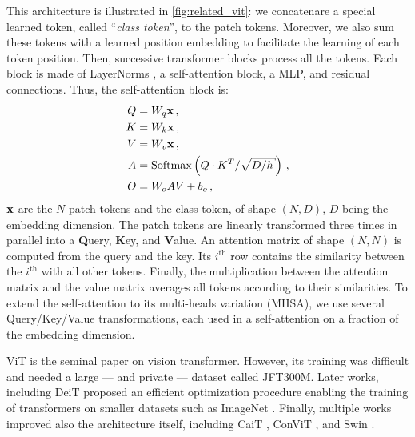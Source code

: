 This architecture is illustrated in \autoref{fig:related_vit}: we concatenare a special learned
token, called ``\textit{class token}'', to the patch tokens. Moreover, we also sum these tokens with
a learned position embedding to facilitate the learning of each token position. Then, successive
transformer blocks process all the tokens. Each block is made of LayerNorms \citep{ba2016layernorm},
a self-attention block, a \ac{MLP}, and residual connections. Thus, the self-attention block is:
%
\begin{equation}
      \begin{aligned}
            Q & =W_{q} \vx\,,                                                       \\
            K & =W_{k} \vx\,,                                                       \\
            V & =W_{v} \vx\,,                                                       \\
            A & =\operatorname{Softmax}\left(Q \cdot K^{T} / \sqrt{D / h}\right)\,, \\
            O & = W_{o} A V+b_{o}\,,
      \end{aligned}
      \label{sec:related_sa}
\end{equation}
%
\noindent $\mathbf{x}$ are the $N$ patch tokens and the class token, of shape $(N, D)$, $D$ being the
embedding dimension. The patch tokens are linearly transformed three times in parallel into a
\textbf{Q}uery, \textbf{K}ey, and \textbf{V}alue. An attention matrix of shape $(N, N)$ is computed
from the query and the key. Its $i^{\text{th}}$ row contains the similarity between the
$i^{\text{th}}$ with all other tokens. Finally, the multiplication between the attention matrix and
the value matrix averages all tokens according to their similarities. To extend the self-attention
to its multi-heads variation (\ac{MHSA}), we use several Query/Key/Value transformations, each
used in a self-attention on a fraction of the embedding dimension.

ViT \citep{dosovitskiy2020vit} is the seminal paper on vision transformer. However, its training was
difficult and needed a large --- and private --- dataset called JFT300M. Later works, including DeiT
\citep{touvron2021deit} proposed an efficient optimization procedure enabling the training of
transformers on smaller datasets such as ImageNet \citep{russakovsky2015imagenet_ilsvrc}. Finally,
multiple works improved also the architecture itself, including CaiT \citep{touvron2021cait}, ConViT
\citep{dascoli2021convit}, and Swin \citep{liu2021swin}.

